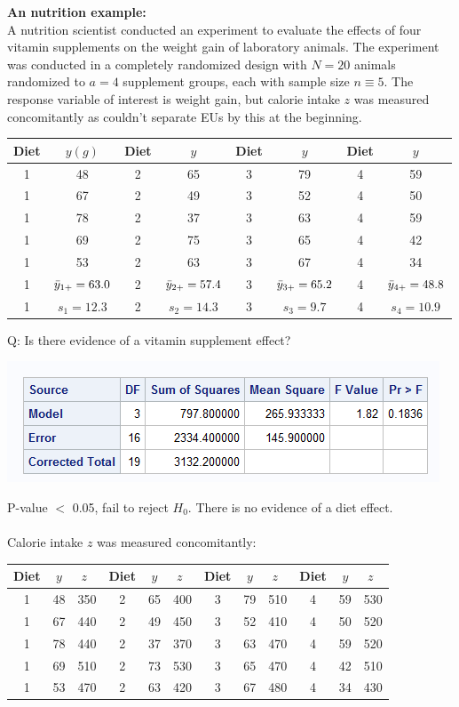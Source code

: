 \textbf{An nutrition example:}\\
A nutrition scientist conducted an experiment to evaluate the effects of four vitamin supplements on the weight gain of laboratory animals.  The experiment was conducted in a completely randomized design with $N=20$ animals randomized to $a=4$ supplement groups, each with sample size $n\equiv 5$.  The response variable of interest is weight gain, but calorie intake $z$ was measured concomitantly as couldn't separate EUs by this at the beginning.  

\begin{center}
\begin{tabular}{|cc|cc|cc|cc|} \hline
Diet & $y(g)$ & Diet & $y$ &Diet & $y$ &Diet & $y$ \\ \hline
1 & 48 & 2 & 65 & 3 & 79 & 4 & 59 \\
1 & 67 & 2 & 49 & 3 & 52 & 4 & 50 \\
1 & 78 & 2 & 37 & 3 & 63 & 4 & 59 \\
1 & 69 & 2 & 75 & 3 & 65 & 4 & 42 \\
1 & 53 & 2 & 63 & 3 & 67 & 4 & 34 \\ \hline
1 & $\bar{y}_{1 +}=63.0$ & 2 & $\bar{y}_{2 +}=57.4$  & 3 & $\bar{y}_{3 +}=65.2$  & 4 & $\bar{y}_{4 +}=48.8$ \\
1 & $s_1=12.3$ & 2 & $s_2=14.3$  & 3 & $s_3=9.7$  & 4 & $s_4=10.9$ \\ \hline
\end{tabular} 
\end{center}

Q: Is there evidence of a vitamin supplement effect?
\begin{center}
\includegraphics{DietsANOVA}
\end{center}
 
P-value $<$ 0.05, fail to reject $H_0$.  There is no evidence of a diet effect.\\~\\
Calorie intake $z$ was measured concomitantly:
\begin{center}
\begin{tabular}{ccc|ccc|ccc|ccc}
Diet & $y$ & $z\ \ $ & Diet & $y$ & $z\ \ $ &Diet & $y$ & $z\ \ $ &Diet & $y$ & $z\ \ $ \\ \hline
1 & 48 & 350 & 2 & 65 & 400 & 3 & 79 & 510 & 4 & 59 & 530 \\
1 & 67 & 440 & 2 & 49 & 450 & 3 & 52 & 410 & 4 & 50 & 520 \\
1 & 78 & 440 & 2 & 37 & 370 & 3 & 63 & 470 & 4 & 59 & 520 \\
1 & 69 & 510 & 2 & 73 & 530 & 3 & 65 & 470 & 4 & 42 & 510 \\
1 & 53 & 470 & 2 & 63 & 420 & 3 & 67 & 480 & 4 & 34 & 430 \\ \hline
\end{tabular} 
\end{center}

